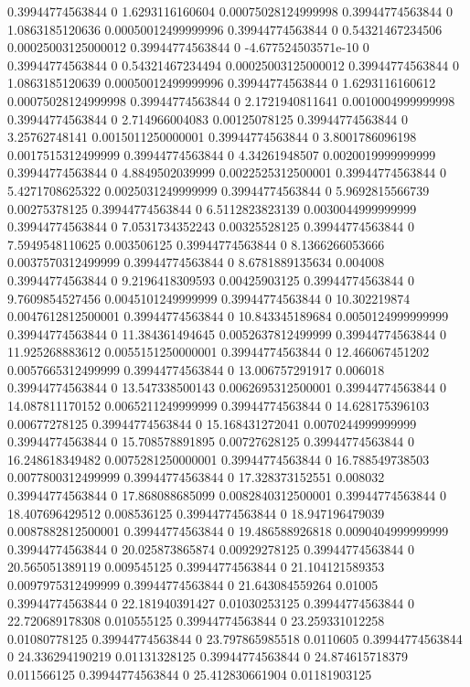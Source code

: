 0.39944774563844 0 1.6293116160604 0.00075028124999998
0.39944774563844 0 1.0863185120636 0.00050012499999996
0.39944774563844 0 0.54321467234506 0.00025003125000012
0.39944774563844 0 -4.677524503571e-10 0
0.39944774563844 0 0.54321467234494 0.00025003125000012
0.39944774563844 0 1.0863185120639 0.00050012499999996
0.39944774563844 0 1.6293116160612 0.00075028124999998
0.39944774563844 0 2.1721940811641 0.0010004999999998
0.39944774563844 0 2.714966004083 0.00125078125
0.39944774563844 0 3.25762748141 0.0015011250000001
0.39944774563844 0 3.8001786096198 0.0017515312499999
0.39944774563844 0 4.34261948507 0.0020019999999999
0.39944774563844 0 4.8849502039999 0.0022525312500001
0.39944774563844 0 5.4271708625322 0.0025031249999999
0.39944774563844 0 5.9692815566739 0.00275378125
0.39944774563844 0 6.5112823823139 0.0030044999999999
0.39944774563844 0 7.0531734352243 0.00325528125
0.39944774563844 0 7.5949548110625 0.003506125
0.39944774563844 0 8.1366266053666 0.0037570312499999
0.39944774563844 0 8.6781889135634 0.004008
0.39944774563844 0 9.2196418309593 0.00425903125
0.39944774563844 0 9.7609854527456 0.0045101249999999
0.39944774563844 0 10.302219874 0.0047612812500001
0.39944774563844 0 10.843345189684 0.0050124999999999
0.39944774563844 0 11.384361494645 0.0052637812499999
0.39944774563844 0 11.925268883612 0.0055151250000001
0.39944774563844 0 12.466067451202 0.0057665312499999
0.39944774563844 0 13.006757291917 0.006018
0.39944774563844 0 13.547338500143 0.0062695312500001
0.39944774563844 0 14.087811170152 0.0065211249999999
0.39944774563844 0 14.628175396103 0.00677278125
0.39944774563844 0 15.168431272041 0.0070244999999999
0.39944774563844 0 15.708578891895 0.00727628125
0.39944774563844 0 16.248618349482 0.0075281250000001
0.39944774563844 0 16.788549738503 0.0077800312499999
0.39944774563844 0 17.328373152551 0.008032
0.39944774563844 0 17.868088685099 0.0082840312500001
0.39944774563844 0 18.407696429512 0.008536125
0.39944774563844 0 18.947196479039 0.0087882812500001
0.39944774563844 0 19.486588926818 0.0090404999999999
0.39944774563844 0 20.025873865874 0.00929278125
0.39944774563844 0 20.565051389119 0.009545125
0.39944774563844 0 21.104121589353 0.0097975312499999
0.39944774563844 0 21.643084559264 0.01005
0.39944774563844 0 22.181940391427 0.01030253125
0.39944774563844 0 22.720689178308 0.010555125
0.39944774563844 0 23.259331012258 0.01080778125
0.39944774563844 0 23.797865985518 0.0110605
0.39944774563844 0 24.336294190219 0.01131328125
0.39944774563844 0 24.874615718379 0.011566125
0.39944774563844 0 25.412830661904 0.01181903125
